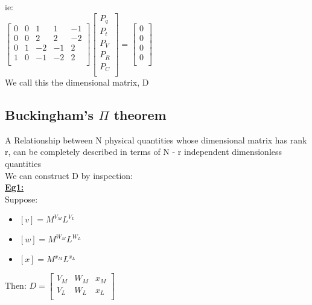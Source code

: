 \documentclass[12pt]{article}
\newcommand{\myt}[1]{\textbf{\underline{#1}}}
\begin{document}
	ie:\\
	$
	\begin{bmatrix}
		0 & 0 & 1 & 1 & -1 \\
		0 & 0 & 2 & 2 & -2 \\
		0 & 1 & -2 & -1 & 2 \\
		1 & 0 & -1 & -2 & 2 \\
	\end{bmatrix}
	\begin{bmatrix}
		P_q \\
		P_t \\
		P_V \\
		P_R \\
		P_C \\
	\end{bmatrix}
	= 
	\begin{bmatrix}
	0 \\
	0 \\
	0 \\
	0 \\
	\end{bmatrix}	
	$\\
	We call this the dimensional matrix, D\\
	
	\subsection*{Buckingham's $\Pi$ theorem}
	A Relationship between N physical quantities whose dimensional matrix has rank r, can be completely described in terms of N - r independent dimensionless quantities\\
	
	We can construct D by inspection:\\
	\myt{Eg1:}\\
	Suppose:\\
	\begin{itemize}
		\item $[v] = M^{V_M}L^{V_L}$
		\item $[w] = M^{W_M}L^{W_L}$
		\item $[x] = M^{x_M}L^{x_L}$
	\end{itemize}
	Then:
	$D = 
	\begin{bmatrix}
		V_M & W_M & x_M \\
		V_L & W_L & x_L \\
	\end{bmatrix}
	$
	
\end{document}
